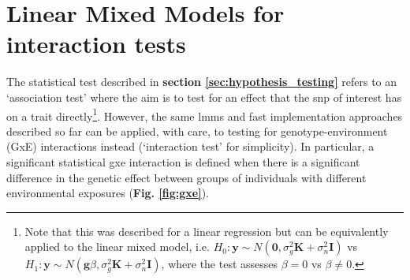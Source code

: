 


\newpage 


\section{Linear Mixed Models for interaction tests}
\label{sec:lmm_gxe}

The  statistical test described in \textbf{section \ref{sec:hypothesis_testing}} refers to an `association test' where the aim is to test for an effect that the \gls{snp} of interest has on a trait directly\footnote{Note that this was described for a linear regression but can be equivalently applied to the linear mixed model, i.e. $H_0: \mathbf{y} \sim N (\mathbf{0}, \sigma_g^2\mathbf{K} + \sigma_n^2\mathbf{I})$ vs $H_1: \mathbf{y} \sim N (\mathbf{g}\beta, \sigma_g^2\mathbf{K} + \sigma_n^2\mathbf{I})$, where the test assesses $\beta = 0$ vs $\beta \neq 0$.}.
However, the same \gls{lmm}s and fast implementation approaches described so far can be applied, with care, to testing for genotype-environment (GxE) interactions instead (`interaction test' for simplicity).
In particular, a significant statistical \gls{gxe} interaction is defined when there is a significant difference in the genetic effect between groups of individuals with different environmental exposures (\textbf{Fig. \ref{fig:gxe}}).

